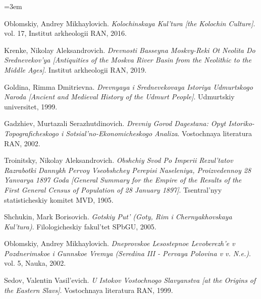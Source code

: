 \documentclass[10pt,onecolumn]{intellte}
\newlength{\csllabelwidth}
\newenvironment{CSLReferences}[2]
 {\par\vspace{2pt}%
  \begin{list}{}{%
  \normalfont\rmfamily\mdseries\fontsize{10pt}{15pt}\selectfont\raggedright
  \hyphenpenalty=50\exhyphenpenalty=50\emergencystretch=3em%
  \renewcommand{\bibitem}[2][]{\item\hypertarget{##2}{}}%
  \setlength{\lineskiplimit}{-6pt}%
  \setlength{\leftmargin}{\csllabelwidth}%
  \setlength{\itemindent}{-\csllabelwidth}%
  \setlength{\labelwidth}{\csllabelwidth}%
  \setlength{\labelsep}{0pt}%
  \setlength{\parsep}{0pt}%
  \setlength{\topsep}{0pt}%
  \setlength{\partopsep}{0pt}%
  \setlength{\itemsep}{2pt}}}
 {\end{list}}
\newcommand{\CSLLeftMargin}[1]{\makebox[\csllabelwidth][l]{\normalfont\rmfamily\mdseries\fontsize{10pt}{15pt}\selectfont #1}}
\newcommand{\CSLRightInline}[1]{\normalfont\rmfamily\mdseries\fontsize{10pt}{15pt}\selectfont #1}
\begin{document}
\protect{}\label{refs}
\begin{CSLReferences}{0}{0}
\CSLLeftMargin{1. }%
\CSLRightInline{Oblomskiy, Andrey Mikhaylovich. \emph{Kolochinskaya
Kul'tura {[}the Kolochin Culture{]}}. vol. 17, Institut arkheologii RAN,
2016.}

\CSLLeftMargin{2. }%
\CSLRightInline{Krenke, Nikolay Aleksandrovich. \emph{Drevnosti Basseyna
Moskvy-Reki Ot Neolita Do Srednevekov'ya {[}Antiquities of the Moskva
River Basin from the Neolithic to the Middle Ages{]}}. Institut
arkheologii RAN, 2019.}

\CSLLeftMargin{3. }%
\CSLRightInline{Goldina, Rimma Dmitrievna. \emph{Drevnyaya i
Srednevekovaya Istoriya Udmurtskogo Naroda {[}Ancient and Medieval
History of the Udmurt People{]}}. Udmurtskiy universitet, 1999.}

\CSLLeftMargin{4. }%
\CSLRightInline{Gadzhiev, Murtazali Serazhutdinovich. \emph{Drevniy
Gorod Dagestana: Opyt Istoriko-Topograficheskogo i
Sotsial'no-Ekonomicheskogo Analiza}. Vostochnaya literatura RAN, 2002.}

\CSLLeftMargin{5. }%
\CSLRightInline{Troinitsky, Nikolay Aleksandrovich. \emph{Obshchiy Svod
Po Imperii Rezul'tatov Razrabotki Dannykh Pervoy Vseobshchey Perepisi
Naseleniya, Proizvedennoy 28 Yanvarya 1897 Goda {[}General Summary for
the Empire of the Results of the First General Census of Population of
28 January 1897{]}}. Tsentral'nyy statisticheskiy komitet MVD, 1905.}

\CSLLeftMargin{6. }%
\CSLRightInline{Shchukin, Mark Borisovich. \emph{Gotskiy Put' (Goty, Rim
i Chernyakhovskaya Kul'tura)}. Filologicheskiy fakul'tet SPbGU, 2005.}

\CSLLeftMargin{7. }%
\CSLRightInline{Oblomskiy, Andrey Mikhaylovich. \emph{Dneprovskoe
Lesostepnoe Levoberezh'e v Pozdnerimskoe i Gunnskoe Vremya (Seredina III
- Pervaya Polovina v v. N.e.)}. vol. 5, Nauka, 2002.}

\CSLLeftMargin{8. }%
\CSLRightInline{Sedov, Valentin Vasil'evich. \emph{U Istokov Vostochnogo
Slavyanstva {[}at the Origins of the Eastern Slavs{]}}. Vostochnaya
literatura RAN, 1999.}


\end{CSLReferences}
\end{document}
